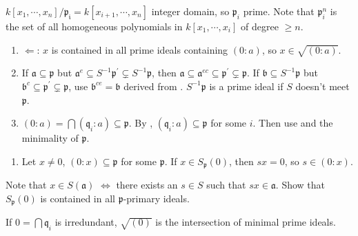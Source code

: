 \begin{exercise}\label{ex4.8}
	$k\left[x_1,\cdots,x_n\right]/\mathfrak{p_i}=k\left[x_{i+1},\cdots,x_n\right]$ integer domain, so $\mathfrak{p}_i$ prime. Note that $\mathfrak{p}_i^n$ is the set of all homogeneous polynomials in $k\left[x_1,\cdots,x_i\right]$ of degree $\geqslant n$.
\end{exercise}

\begin{exercise}\label{ex4.9}
	\begin{enumerate}[label=(\roman*),ref=\theexercise(\roman*)]
		\item $\Leftarrow$: $x$ is contained in all prime ideals containing $(0:a)$, so $x\in\sqrt{(0:a)}$.
		\item If $\mathfrak{a}\subseteq\mathfrak{p}$ but $\mathfrak{a}^e\subseteq S^{-1}\mathfrak{p}^\prime\subsetneq S^{-1}\mathfrak{p}$, then $\mathfrak{a}\subseteq\mathfrak{a}^{ec}\subseteq\mathfrak{p}^\prime\subsetneq\mathfrak{p}$. If $\mathfrak{b}\subseteq S^{-1}\mathfrak{p}$ but $\mathfrak{b}^c\subseteq\mathfrak{p}^\prime\subsetneq\mathfrak{p}$, use $\mathfrak{b}^{ce}=\mathfrak{b}$ derived from . $S^{-1}\mathfrak{p}$ is a prime ideal if $S$ doesn't meet $\mathfrak{p}$.
		\item $(0:a)=\bigcap\left(\mathfrak{q}_i:a\right)\subseteq\mathfrak{p}$. By , $\left(\mathfrak{q}_i:a\right)\subseteq\mathfrak{p}$ for some $i$. Then use  and the minimality of $\mathfrak{p}$.
	\end{enumerate}
\end{exercise}

\begin{exercise}\label{ex4.10}
	\begin{enumerate}
		\item[(iv)] Let $x\neq0$, $(0:x)\subseteq\mathfrak{p}$ for some $\mathfrak{p}$. If $x\in S_\mathfrak{p}(0)$, then $sx=0$, so $s\in(0:x)$.
	\end{enumerate}
\end{exercise}

\begin{exercise}\label{ex4.11}
	Note that $x\in S(\mathfrak{a})$ $\Leftrightarrow$ there exists an $s\in S$ such that $sx\in\mathfrak{a}$. Show that $S_\mathfrak{p}(0)$ is contained in all $\mathfrak{p}$-primary ideals.\par
	If $0=\bigcap\mathfrak{q}_i$ is irredundant, $\sqrt{(0)}$ is the intersection of minimal prime ideals.
\end{exercise}

